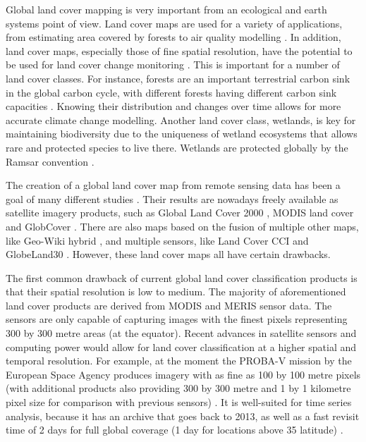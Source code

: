 \documentclass[a4paper,12pt]{scrbook}
\begin{document}
Global land cover mapping is very important from an ecological and earth systems point of view. Land cover maps are used for a variety of applications, from estimating area covered by forests \citep{bartalev2014probavboreal} to air quality modelling \citep{wiedinmyer2006airquality}. In addition, land cover maps, especially those of fine spatial resolution, have the potential to be used for land cover change monitoring \citep{defourny2012cci}. This is important for a number of land cover classes. For instance, forests are an important terrestrial carbon sink in the global carbon cycle, with different forests having different carbon sink capacities \citep{pan2011large}. Knowing their distribution and changes over time allows for more accurate climate change modelling. Another land cover class, wetlands, is key for maintaining biodiversity due to the uniqueness of wetland ecosystems that allows rare and protected species to live there. Wetlands are protected globally by the Ramsar convention \citep{davis1994ramsar}.

The creation of a global land cover map from remote sensing data has been a goal of many different studies \citep{hansen2000hardtree}. Their results are nowadays freely available as satellite imagery products, such as Global Land Cover 2000 \citep{bartholome2005glc2000}, MODIS land cover \citep{friedl2010modis} and GlobCover \citep{arino2007globcover}. There are also maps based on the fusion of multiple other maps, like Geo-Wiki hybrid \citep{see2015hybrid}, and multiple sensors, like Land Cover CCI \citep{lccciguide} and GlobeLand30 \citep{chen2015globeland30}. However, these land cover maps all have certain drawbacks.

The first common drawback of current global land cover classification products is that their spatial resolution is low to medium. The majority of aforementioned land cover products are derived from MODIS and MERIS sensor data. The sensors are only capable of capturing images with the finest pixels representing 300 by 300 metre areas (at the equator). Recent advances in satellite sensors and computing power would allow for land cover classification at a higher spatial and temporal resolution. For example, at the moment the PROBA-V mission by the European Space Agency produces imagery with as fine as 100 by 100 metre pixels (with additional products also providing 300 by 300 metre and 1 by 1 kilometre pixel size for comparison with previous sensors) \citep{probavguide}. It is well-suited for time series analysis, because it has an archive that goes back to 2013, as well as a fast revisit time of 2 days for full global coverage (1 day for locations above 35\textdegree{} latitude) \citep{dierckx2014probav}.
\end{document}
